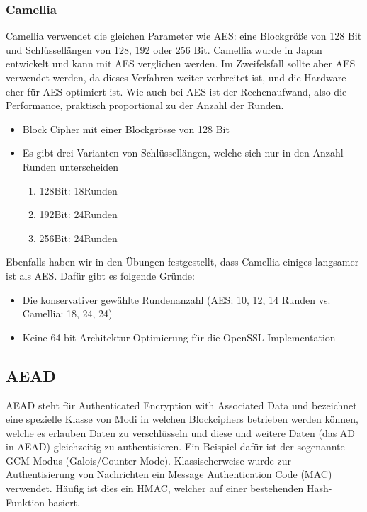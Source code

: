 \subsubsection{Camellia}
Camellia verwendet die gleichen Parameter wie AES: eine Blockgröße von 128 Bit und Schlüssellängen von 128, 192 oder 256 Bit. Camellia wurde in Japan entwickelt und kann mit AES verglichen werden. Im Zweifelsfall sollte aber AES verwendet werden, da dieses Verfahren weiter verbreitet ist, und die Hardware eher für AES optimiert ist. Wie auch bei AES ist der Rechenaufwand, also die Performance, praktisch proportional zu der Anzahl der Runden.
\begin{itemize}
	\item Block Cipher mit einer Blockgrösse von 128 Bit
	\item Es gibt drei Varianten von Schlüssellängen, welche sich nur in den Anzahl Runden unterscheiden
	\begin{enumerate}
		\item 128Bit: 18Runden
		\item 192Bit: 24Runden
		\item 256Bit: 24Runden
	\end{enumerate}
\end{itemize}

Ebenfalls haben wir in den Übungen festgestellt, dass Camellia einiges langsamer ist als AES. Dafür gibt es folgende Gründe:
\begin{itemize}
    \item Die konservativer gewählte Rundenanzahl (AES: 10, 12, 14 Runden vs. Camellia: 18, 24, 24)
    \item Keine 64-bit Architektur Optimierung für die OpenSSL-Implementation
\end{itemize}

\subsection{AEAD}
AEAD steht für Authenticated Encryption with Associated Data und bezeichnet eine spezielle Klasse von Modi in welchen Blockciphers betrieben werden können, welche es erlauben Daten zu verschlüsseln und diese und weitere Daten (das AD in AEAD) gleichzeitig zu authentisieren. Ein Beispiel dafür ist der sogenannte GCM Modus (Galois/Counter Mode). Klassischerweise wurde zur Authentisierung von Nachrichten ein Message Authentication Code (MAC) verwendet. Häufig ist dies ein HMAC, welcher auf einer bestehenden Hash-Funktion basiert. 

